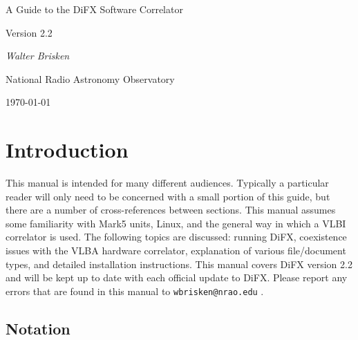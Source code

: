 \documentclass{article}
\begin{document}
\newcommand{\Oa}[1]{\hspace{-12pt}\makebox[12pt]{$\star$}#1}
\newcommand{\Da}[1]{\hspace{-12pt}\makebox[12pt]{$\times$}#1}
\newcommand{\bfit}[1]{{\textrm{\textit{\textmd{#1}}}}}


\begin{center}

\vspace{5pt}

{\LARGE A Guide to the DiFX Software Correlator}

\vspace{5pt}

{\Large Version 2.2}


\vspace{10pt}

{\it Walter Brisken}

\vspace{5pt}

National Radio Astronomy Observatory

\vspace{5pt}
\today

\end{center}

\tableofcontents

\section{Introduction}

This manual is intended for many different audiences.
Typically a particular reader will only need to be concerned with a small portion of this guide, but there are a number of cross-references between sections.
This manual assumes some familiarity with Mark5 units, Linux, and the general way in which a VLBI correlator is used.
The following topics are discussed: running DiFX, coexistence issues with the VLBA hardware correlator, explanation of various file/document types, and detailed installation instructions.
This manual covers DiFX version 2.2 and will be kept up to date with each official update to DiFX.
Please report any errors that are found in this manual to {\tt wbrisken@nrao.edu} .

\subsection{Notation}
\end{document}

